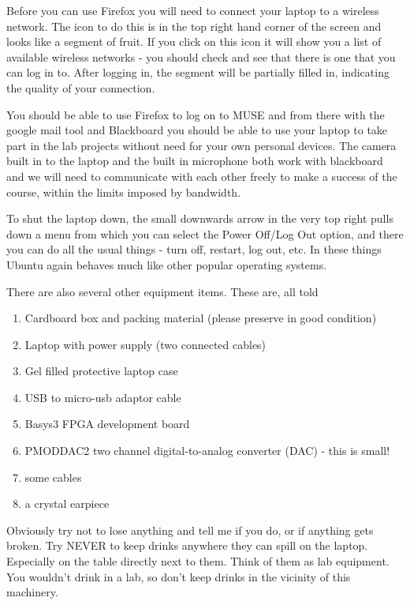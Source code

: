 \documentclass[../physical_computing.tex]{subfiles}
\begin{document}
Before you can use Firefox you will need to connect your laptop to a wireless network. The icon to do this is in the top right hand corner of the screen and looks like a segment of fruit. If you click on this icon it will show you a list of available wireless networks - you should check and see that there is one that you can log in to. After logging in, the segment will be partially filled in, indicating the quality of your connection.

You should be able to use Firefox to log on to MUSE and from there with the google mail tool and Blackboard you should be able to use your laptop to take part in the lab projects without need for your own personal devices. The camera built in to the laptop and the built in microphone both work with blackboard and we will need to communicate with each other freely to make a success of the course, within the limits imposed by bandwidth.

To shut the laptop down, the small downwards arrow in the very top right pulls down a menu from which you can select the Power Off/Log Out option, and there you can do all the usual things - turn off, restart, log out, etc. In these things Ubuntu again behaves much like other popular operating systems.

There are also several other equipment items. These are, all told
\begin{enumerate}
    \item Cardboard box and packing material (please preserve in good condition)
    \item Laptop with power supply (two connected cables)
    \item Gel filled protective laptop case
    \item USB to micro-usb adaptor cable
    \item Basys3 FPGA development board
    \item PMODDAC2 two channel digital-to-analog converter (DAC) - this is small!
    \item some cables
    \item a crystal earpiece
\end{enumerate}

Obviously try not to lose anything and tell me if you do, or if anything gets broken. Try NEVER to keep drinks anywhere they can spill on the laptop. Especially on the table directly next to them. Think of them as lab equipment. You wouldn't drink in a lab, so don't keep drinks in the vicinity of this machinery.
\end{document}
